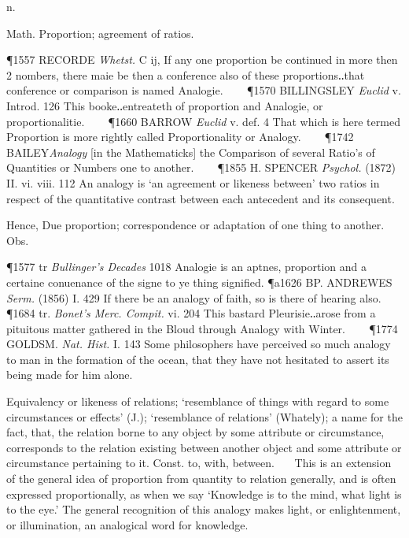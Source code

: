 \begin{description}[wide, labelwidth=!, labelindent=0pt]
  n.

\noindent  {}

\vspace{-0.3cm}

\begin{myenumerate}
 Math. Proportion; agreement of ratios. 

\P 1557 RECORDE \textit{Whetst.} C ij, If any one proportion be continued in more then 2 nombers, there maie be then a conference also of these proportions‥that conference or comparison is named Analogie.    
\P 1570 BILLINGSLEY \textit{Euclid} v. Introd. 126 This booke‥entreateth of proportion and Analogie, or proportionalitie.    
\P 1660 BARROW \textit{Euclid} v. def. 4 That which is here termed Proportion is more rightly called Proportionality or Analogy.    
\P 1742 BAILEY\textit{Analogy} [in the Mathematicks] the Comparison of several Ratio's of Quantities or Numbers one to another.    
\P 1855 H. SPENCER \textit{Psychol.} (1872) II. vi. viii. 112 An analogy is ‘an agreement or likeness between’ two ratios in respect of the quantitative contrast between each antecedent and its consequent.

 Hence, Due proportion; correspondence or adaptation of one thing to another. Obs. 

\P 1577 tr \textit{Bullinger's Decades} 1018 Analogie is an aptnes, proportion and a certaine conuenance of the signe to ye thing signified.
\P a1626 BP. ANDREWES \textit{Serm.} (1856) I. 429 If there be an analogy of faith, so is there of hearing also.    
\P 1684 tr. \textit{Bonet's Merc. Compit.} vi. 204 This bastard Pleurisie‥arose from a pituitous matter gathered in the Bloud through Analogy with Winter.    
\P 1774 GOLDSM. \textit{Nat. Hist.} I. 143 Some philosophers have perceived so much analogy to man in the formation of the ocean, that they have not hesitated to assert its being made for him alone.

 Equivalency or likeness of relations; ‘resemblance of things with regard to some circumstances or effects’ (J.); ‘resemblance of relations’ (Whately); a name for the fact, that, the relation borne to any object by some attribute or circumstance, corresponds to the relation existing between another object and some attribute or circumstance pertaining to it. Const. to, with, between.
   This is an extension of the general idea of proportion from quantity to relation generally, and is often expressed proportionally, as when we say ‘Knowledge is to the mind, what light is to the eye.’ The general recognition of this analogy makes light, or enlightenment, or illumination, an analogical word for knowledge. 


\end{myenumerate}
\end{description}
